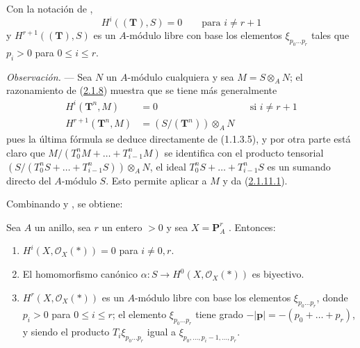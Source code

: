 \begin{corollary}[2.1.10]
\label{III.2.1.10}
\label{III.2.1.10-fr}
Con la notación de ,
\begin{equation}
\label{III.2.1.10.1-fr}
\tag{2.1.10.1}
H^i((\mathbf T),S)=0\qquad\text{para }i\neq r+1
\end{equation}
y $H^{r+1}((\mathbf T),S)$ es un $A$-módulo libre con base los elementos $\xi_{p_0\ldots p_r}$ tales que $p_i>0$ para $0\leq i\leq r$.
\end{corollary}

\begin{env}[2.1.11]
\label{III.2.1.11}
\label{III.2.1.11-fr}
\emph{Observación.} ---
Sea $N$ un $A$-módulo cualquiera y sea $M=S\otimes_A N$; el razonamiento de
(\hyperref[III.2.1.8-fr]{2.1.8}) muestra que se tiene más generalmente
\begin{align}
\label{III.2.1.11.1-fr}
\tag{2.1.11.1}
H^i(\mathbf T^n,M)&=0 &&\text{si }i\neq r+1\\
\label{III.2.1.11.2-fr}
\tag{2.1.11.2}
H^{r+1}(\mathbf T^n,M)&=(S/(\mathbf T^n))\otimes_A N
\end{align}
pues la última fórmula se deduce directamente de (1.1.3.5), y por otra
parte está claro que
$M/(T_0^nM+\ldots+T_{i-1}^nM)$
se identifica con el producto tensorial
$(S/(T_0^nS+\ldots+T_{i-1}^nS))\otimes_A N$,
el ideal $T_0^nS+\ldots+T_{i-1}^nS$ es un sumando directo del $A$-módulo $S$.
Esto permite aplicar  a $M$ y da (\hyperref[III.2.1.11.1]{2.1.11.1}).
\end{env}

Combinando  y , se obtiene:

\begin{proposition}[2.1.12]
\label{III.2.1.12}
\label{III.2.1.12-fr}
Sea $A$ un anillo, sea $r$ un entero $>0$ y sea $X=\mathbf P_A^r$ .
Entonces:
\begin{enumerate}
  \item[{\rm(i)}] $H^i(X,\mathcal O_X(*))=0$ para $i\neq0,r$.
  \item[{\rm(ii)}] El homomorfismo canónico $\alpha:S\to H^0(X,\mathcal O_X(*))$  es biyectivo.
  \item[{\rm(iii)}] $H^r(X,\mathcal O_X(*))$ es un $A$-módulo libre con base los elementos $\xi_{p_0\ldots p_r}$, donde $p_i>0$ para $0\leq i\leq r$; el elemento $\xi_{p_0\ldots p_r}$ tiene grado $-|\mathbf p|=-(p_0+\ldots+p_r)$, y siendo el producto
$T_i\xi_{p_0\ldots p_r}$ igual a
$\xi_{p_0,\ldots,p_i-1,\ldots,p_r}$.
\end{enumerate}
\end{proposition}

